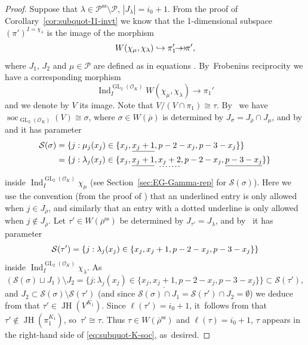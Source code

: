 \documentclass[JEP,XML,SOM,Unicode,NoFloatCountersInSection, NoEqCountersInSection,published]{cedram}
\newcommand\hto{\mathrel{\lhook\joinrel\to}}
\newcommand{\onto}{\mathchoice{\to\hspace*{-5mm}\to}{\mathrel{\hbox{$\to\hspace*{-2.85mm}\to$}}}{\to\hspace*{-3mm}\to}{\to\hspace*{-3mm}\to}}
\let\un\underline
\newcommand{\cO}{\mathcal{O}}
\renewcommand{\P}{\mathscr P}
\renewcommand{\ss}{\mathrm{ss}}
\newcommand{\rhobar}{\overline{\rho}}
\newcommand{\brho}{\overline{\rho}}
\DeclareMathOperator{\GL}{GL}
\DeclareMathOperator{\Ind}{Ind}
\DeclareMathOperator{\JH}{\mathrm{JH}}
\DeclareMathOperator{\soc}{soc}
\theoremstyle{plain}
\theoremstyle{definition}
\begin{document}
\begin{proof}
Suppose that $\lambda\in \P^\ss\setminus \P$, $|J_{\lambda}| = i_0+1$.
From the proof of Corollary~\ref{cor:subquot-I1-invt} we know that the 1-dimensional subspace $(\pi')^{I=\chi_\lambda}$ is the image of the morphism
\[
W(\chi_\mu,\chi_\lambda) \hto \pi_1' \onto \pi',
\]
where $J_1$, $J_2$ and $\mu \in \P$ are defined as in equations \cite[Eq.\,(60), eq.~(61)]{BHHMS4}. By~Frobenius reciprocity we have a corresponding morphism
\[
\Ind_I^{\GL_2(\cO_K)} W(\chi_\mu,\chi_\lambda) \to \pi_1'
\]
and we denote by $V$ its image.
Note that $V/(V \cap \pi_1) \cong \tau$. By~\cite[Lem.\,4.3.9(i)]{BHHMS4} we have $\soc_{\GL_2(\cO_K)}(V) \cong \sigma$, where $\sigma \in W(\brho)$ is determined by $J_\sigma = J_{\brho} \cap J_\mu$, and by \cite[Lem.\,4.1.1]{BHHMS4} and \cite[Eq.\,(61)]{BHHMS4} it has parameter
\begin{align*}
\mathcal{S}(\sigma) &= \{ j: \mu_j(x_j)\in\{x_j,\un{x_j+1},p-2-x_j,p-3-x_j\} \} \\
&= \{ j: \lambda_j(x_j) \in \{ x_j,\un{x_j+1},\dotuline{x_j+2},p-2-x_j,\un{p-3-x_j} \}\}
\end{align*}
inside $\Ind_I^{\GL_2(\cO_K)} \chi_\mu$ ({see Section~\ref{sec:EG-Gamma-rep}} for $\mathcal{S}(\sigma)$).
Here we use the convention {(from the proof of \cite[Lem.\,4.1.1]{BHHMS4})} that an underlined entry is only allowed when $j \in J_{\rhobar}$, and similarly that an entry with a dotted underline is only allowed when $j \notin J_{\rhobar}$.
Let $\tau' \in W(\brho^\ss)$ be determined by $J_{\tau'} = J_\lambda$, and by~\cite[Lem.\,3.1.3]{BHHMS4} it has parameter
\begin{equation*}
\mathcal{S}(\tau') = \{ j: \lambda_j(x_j)\in\{x_j,x_j+1,p-2-x_j,p-3-x_j\} \} \\
\end{equation*}
inside $\Ind_I^{\GL_2(\cO_K)} \chi_\lambda$. As
\begin{equation*}
(\mathcal{S}(\sigma) \sqcup J_1) \setminus J_2 = \{ j: \lambda_j(x_j) \in \{ x_j,\un{x_j+1},p-2-x_j,p-3-x_j \}\} \subset \mathcal{S}(\tau'),
\end{equation*}
and $J_2 \subset \mathcal{S}(\sigma) \setminus \mathcal{S}(\tau')$ (and since $\mathcal{S}(\sigma) \cap J_1=\mathcal{S}(\tau') \cap J_2=\emptyset$) we deduce from \cite[Prop.\,4.3.6(ii), Prop.~4.3.8]{BHHMS4} that $\tau' \in \JH(V^{K_1})$.
Since $\ell(\tau') = i_0+1$, it~follows from \cite[Th.\,4.3.15]{BHHMS4}
that $\tau' \notin \JH(\pi_1^{K_1})$, so~$\tau' \cong \tau$.
Thus $\tau\in W(\brho^\ss)$ and $\ell(\tau)=i_0+1$, \ie $\tau$ appears in the right-hand side of \eqref{eq:subquot-K-soc}, as~desired.
\end{proof}
\end{document}
